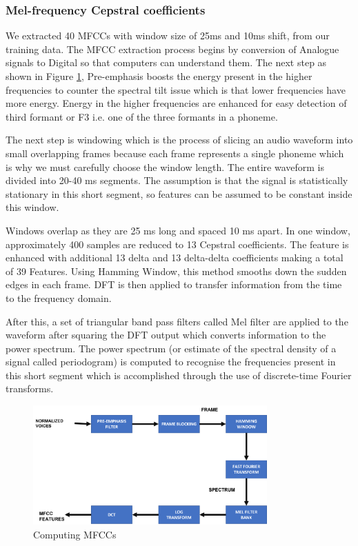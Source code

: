\documentclass{article}
\begin{document}
\subsubsection{Mel-frequency Cepstral coefficients}
\label{sub:MFCC-trg}

We extracted 40 MFCCs with  window size of 25ms and 10ms shift, from our training data. The MFCC extraction process begins by conversion of Analogue signals to Digital so that computers can understand them. The next step as shown in Figure \ref{fig:MFCCs-computation}, Pre-emphasis boosts the energy present in the higher frequencies to counter the spectral tilt issue which is that lower frequencies have more energy. Energy in the higher frequencies are enhanced for easy detection of third formant or F3 i.e. one of the three formants in a phoneme. 

The next step is windowing which is the process of slicing an audio waveform into small overlapping frames because each frame represents a single phoneme which is why we must carefully choose the window length. The entire waveform is divided into 20-40 ms segments. The assumption is that the signal is statistically stationary in this short segment, so features can be assumed to be constant inside this window. %

Windows overlap as they are 25 ms long and spaced 10 ms apart. In one window, approximately 400 samples are reduced to 13 Cepstral coefficients. The feature is enhanced with additional 13 delta and 13 delta-delta coefficients making a total of 39 Features. Using Hamming Window, this method smooths down the sudden edges in each frame. DFT is then applied to transfer information from the time to the frequency domain. 

After this, a set of triangular band pass filters called Mel filter are applied to the waveform after squaring the DFT output which converts information to the power spectrum. The power spectrum (or estimate of the spectral density of a signal called periodogram) is computed to recognise the frequencies present in this short segment which is accomplished through the use of discrete-time Fourier transforms.   

\begin{figure}[h]
    \centering
    \includegraphics[width=0.8\textwidth]{img/feature-extraction.png}
    \caption{Computing MFCCs}
    \label{fig:MFCCs-computation}
\end{figure}
\end{document}
